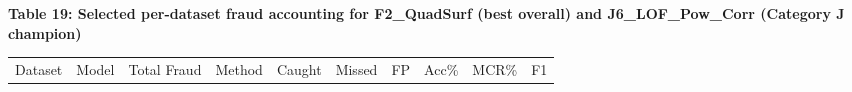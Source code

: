 \documentclass[
  11pt,
]{article}
\newcounter{none} %
\begin{document}
\textbf{Table 19: Selected per-dataset fraud accounting for F2\_QuadSurf
(best overall) and J6\_LOF\_Pow\_Corr (Category J champion)}

{\def\LTcaptype{none} %
\begin{longtable}[]{@{}
  >{\raggedright\arraybackslash}p{}
  >{\raggedright\arraybackslash}p{}
  >{\raggedright\arraybackslash}p{}
  >{\raggedright\arraybackslash}p{}
  >{\raggedright\arraybackslash}p{}
  >{\raggedright\arraybackslash}p{}
  >{\raggedright\arraybackslash}p{}
  >{\raggedright\arraybackslash}p{}
  >{\raggedright\arraybackslash}p{}
  >{\raggedright\arraybackslash}p{}@{}}
\toprule\noalign{}
\begin{minipage}[b]{\linewidth}\raggedright
Dataset
\end{minipage} & \begin{minipage}[b]{\linewidth}\raggedright
Model
\end{minipage} & \begin{minipage}[b]{\linewidth}\raggedright
Total Fraud
\end{minipage} & \begin{minipage}[b]{\linewidth}\raggedright
Method
\end{minipage} & \begin{minipage}[b]{\linewidth}\raggedright
Caught
\end{minipage} & \begin{minipage}[b]{\linewidth}\raggedright
Missed
\end{minipage} & \begin{minipage}[b]{\linewidth}\raggedright
FP
\end{minipage} & \begin{minipage}[b]{\linewidth}\raggedright
Acc\%
\end{minipage} & \begin{minipage}[b]{\linewidth}\raggedright
MCR\%
\end{minipage} & \begin{minipage}[b]{\linewidth}\raggedright
F1
\end{minipage} \\

\end{longtable}}
\end{document}

